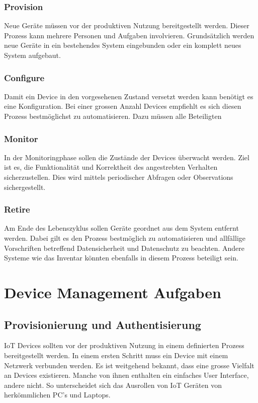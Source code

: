 \subsubsection{Provision}
Neue Geräte müssen vor der produktiven Nutzung bereitgestellt werden. Dieser Prozess kann mehrere Personen und Aufgaben involvieren. Grundsätzlich werden neue Geräte in ein bestehendes System eingebunden oder ein komplett neues System aufgebaut.
\subsubsection{Configure}
Damit ein Device in den vorgesehenen Zustand versetzt werden kann benötigt es eine Konfiguration. Bei einer grossen Anzahl Devices empfiehlt es sich diesen Prozess bestmöglichst zu automatisieren. Dazu müssen alle Beteiligten  
\subsubsection{Monitor}
In der Monitoringphase sollen die Zustände der Devices überwacht werden. Ziel ist es, die Funktionalität und Korrektheit des angestrebten Verhalten sicherzustellen. Dies wird mittels periodischer Abfragen oder Observations sichergestellt. 
\subsubsection{Retire}
Am Ende des Lebenszyklus sollen Geräte geordnet aus dem System entfernt werden. Dabei gilt es den Prozess bestmöglich zu automatisieren und allfällige Vorschriften betreffend Datensicherheit und Datenschutz zu beachten. Andere Systeme wie das Inventar könnten ebenfalls in diesem Prozess beteiligt sein.
\section{Device Management Aufgaben}
\subsection{Provisionierung und Authentisierung}
IoT Devices sollten vor der produktiven Nutzung in einem definierten Prozess bereitgestellt werden. In einem ersten Schritt muss ein Device mit einem Netzwerk verbunden werden. Es ist weitgehend bekannt, dass eine grosse Vielfalt an Devices existieren. Manche von ihnen enthalten ein einfaches User Interface, andere nicht. So unterscheidet sich das Ausrollen von IoT Geräten von herkömmlichen PC's und Laptops.  

